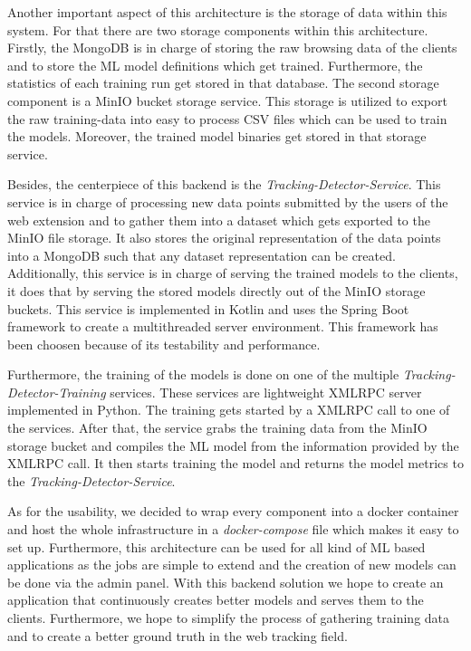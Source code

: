 Another important aspect of this architecture is the storage of data within this system. For that there are two storage components within this
architecture. Firstly, the MongoDB is in charge of storing the raw browsing data of the clients and to store the ML model definitions which get 
trained. Furthermore, the statistics of each training run get stored in that database. The second storage component is a MinIO bucket storage service.
This storage is utilized to export the raw training-data into easy to process CSV files which can be used to train the models. Moreover, the trained model
binaries get stored in that storage service.

Besides, the centerpiece of this backend is the \emph{Tracking-Detector-Service}. This service is in charge of processing new data points 
submitted by the users of the web extension and to gather them into a dataset which gets exported to the MinIO file storage. It also stores 
the original representation of the data points into a MongoDB such that any dataset representation can be created. Additionally, this service
is in charge of serving the trained models to the clients, it does that by serving the stored models directly out of the MinIO storage buckets.
This service is implemented in Kotlin and uses the Spring Boot framework to create a multithreaded server environment. This framework has been choosen
because of its testability and performance.

Furthermore, the training of the models is done on one of the multiple \emph{Tracking-Detector-Training} services. These services are
lightweight XMLRPC server implemented in Python. The training gets started by a XMLRPC call to one of the services. After that, the service
grabs the training data from the MinIO storage bucket and compiles the ML model from the information provided by the XMLRPC call. It then starts
training the model and returns the model metrics to the \emph{Tracking-Detector-Service}.

As for the usability, we decided to wrap every component into a docker container and host the whole infrastructure in a \emph{docker-compose}
file which makes it easy to set up. Furthermore, this architecture can be used for all kind of ML based applications as the jobs are simple to extend 
and the creation of new models can be done via the admin panel. With this backend solution we hope to create an application that continuously creates
better models and serves them to the clients. Furthermore, we hope to simplify the process of gathering training data and to create a better
ground truth in the web tracking field.

